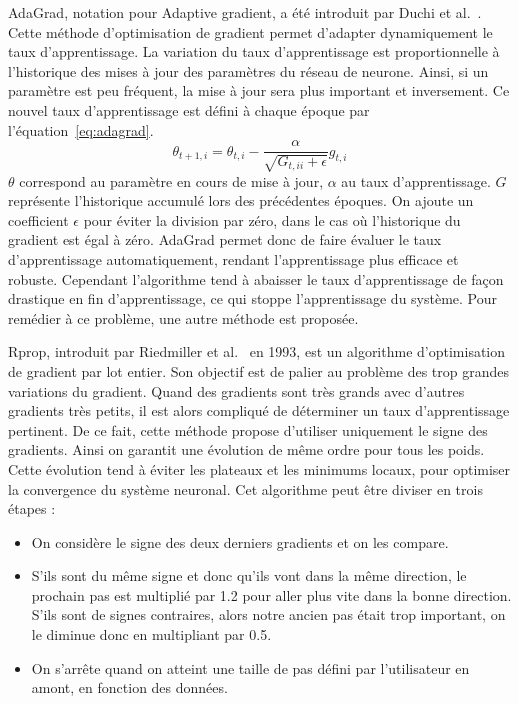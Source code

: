 AdaGrad, notation pour Adaptive gradient, a été introduit par Duchi et al.~\cite{Duchi2011}. Cette méthode d'optimisation de gradient permet d'adapter dynamiquement le taux d'apprentissage. La variation du taux d'apprentissage est proportionnelle à l'historique des mises à jour des paramètres du réseau de neurone. Ainsi, si un paramètre est peu fréquent, la mise à jour sera plus important et inversement. Ce nouvel taux d'apprentissage est défini à chaque époque par l'équation~\ref{eq:adagrad}.
\begin{equation}
  \theta_{t+1, i} = \theta_{t, i} - \frac{\alpha}{\sqrt{G_{t, ii} + \epsilon}}g_{t, i}
  \label{eq:adagrad}
\end{equation}
$\theta$ correspond au paramètre en cours de mise à jour, $\alpha$ au taux d'apprentissage. $G$ représente l'historique accumulé lors des précédentes époques. On ajoute un coefficient $\epsilon$ pour éviter la division par zéro, dans le cas où l'historique du gradient est égal à zéro. AdaGrad permet donc de faire évaluer le taux d'apprentissage automatiquement, rendant l'apprentissage plus efficace et robuste. Cependant l'algorithme tend à abaisser le taux d'apprentissage de façon drastique en fin d'apprentissage, ce qui stoppe l'apprentissage du système. Pour remédier à ce problème, une autre méthode est proposée.

Rprop, introduit par Riedmiller et al.~\cite{Riedmiller1993} en 1993, est un algorithme d'optimisation de gradient par lot entier. Son objectif est de palier au problème des trop grandes variations du gradient. Quand des gradients sont très grands avec d'autres gradients très petits, il est alors compliqué de déterminer un taux d'apprentissage pertinent. De ce fait, cette méthode propose d'utiliser uniquement le signe des gradients. Ainsi on garantit une évolution de même ordre pour tous les poids. Cette évolution tend à éviter les plateaux et les minimums locaux, pour optimiser la convergence du système neuronal. Cet algorithme peut être diviser en trois étapes :
\begin{itemize}
  \item On considère le signe des deux derniers gradients et on les compare.
  \item S'ils sont du même signe et donc qu'ils vont dans la même direction, le prochain pas est multiplié par 1.2 pour aller plus vite dans la bonne direction. S'ils sont de signes contraires, alors notre ancien pas était trop important, on le diminue donc en multipliant par 0.5.
  \item On s'arrête quand on atteint une taille de pas défini par l'utilisateur en amont, en fonction des données.
\end{itemize}


